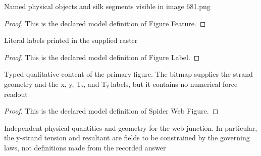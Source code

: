 \begin{definition}
  \label{def:physics:phyx-mini-0681:phyxminiproblems-problemphyxmini0681-figurefeature}
  Named physical objects and silk segments visible in image 681.png
\end{definition}
\begin{proof}
  This is the declared model definition of Figure Feature.
\end{proof}
\begin{definition}
  \label{def:physics:phyx-mini-0681:phyxminiproblems-problemphyxmini0681-figurelabel}
  Literal labels printed in the supplied raster
\end{definition}
\begin{proof}
  This is the declared model definition of Figure Label.
\end{proof}
\begin{definition}
  \label{def:physics:phyx-mini-0681:phyxminiproblems-problemphyxmini0681-spiderwebfigure}
  Typed qualitative content of the primary figure. The bitmap supplies the strand geometry and the x, y, Tₓ, and Tᵧ labels, but it contains no numerical force readout
\end{definition}
\begin{proof}
  This is the declared model definition of Spider Web Figure.
\end{proof}
\begin{definition}
  \label{def:physics:phyx-mini-0681:phyxminiproblems-problemphyxmini0681-spiderwebstaticssetup}
  Independent physical quantities and geometry for the web junction. In particular, the y-strand tension and resultant are fields to be constrained by the governing laws, not definitions made from the recorded answer
\end{definition}
